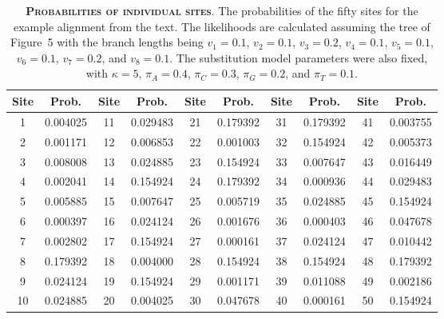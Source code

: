\documentclass{svmult}
\begin{document}
\begin{table}[b]
\centering
\caption{\textbf{\textsc{Probabilities of individual sites}}.
The probabilities of the fifty sites for the example alignment from the text. The likelihoods are
calculated assuming the tree of Figure~5 with the branch lengths being $v_1 = 0.1$, $v_2 =
0.1$, $v_3 = 0.2$, $v_4 = 0.1$, $v_5 = 0.1$, $v_6 = 0.1$, $v_7 = 0.2$, and $v_8 = 0.1$. The
substitution model parameters were also fixed, with $\kappa = 5$, $\pi_A = 0.4$, $\pi_C = 0.3$,
$\pi_G = 0.2$, and $\pi_T = 0.1$.}
\begin{tabular}{cccccccccc}
Site  & Prob.               & Site        & Prob.               & Site        & Prob.              & Site        & Prob.               & Site        & Prob.              \\ \hline
1	&	0.004025	&	11	&	0.029483	&	21	&	0.179392	&	31	&	0.179392	&	41	&	0.003755 \\
2	&	0.001171	&	12	&	0.006853	&	22	&	0.001003	&	32	&	0.154924	&	42	&	0.005373 \\
3	&	0.008008	&	13	&	0.024885	&	23	&	0.154924	&	33	&	0.007647	&	43	&	0.016449 \\
4	&	0.002041	&	14	&	0.154924	&	24	&	0.179392	&	34	&	0.000936	&	44	&	0.029483 \\
5	&	0.005885	&	15	&	0.007647	&	25	&	0.005719	&	35	&	0.024885	&	45	&	0.154924 \\
6	&	0.000397	&	16	&	0.024124	&	26	&	0.001676	&	36	&	0.000403	&	46	&	0.047678 \\
7	&	0.002802	&	17	&	0.154924	&	27	&	0.000161	&	37	&	0.024124	&	47	&	0.010442 \\
8	&	0.179392	&	18	&	0.004000	&	28	&	0.154924	&	38	&	0.154924	&	48	&	0.179392 \\
9	&	0.024124	&	19	&	0.154924	&	29	&	0.001171	&	39	&	0.011088	&	49	&	0.002186 \\
10	&	0.024885	&	20	&	0.004025	&	30	&	0.047678	&	40	&	0.000161	&	50	&	0.154924 \\ \hline
\end{tabular}
\label{tab1}
\end{table}
\end{document}
